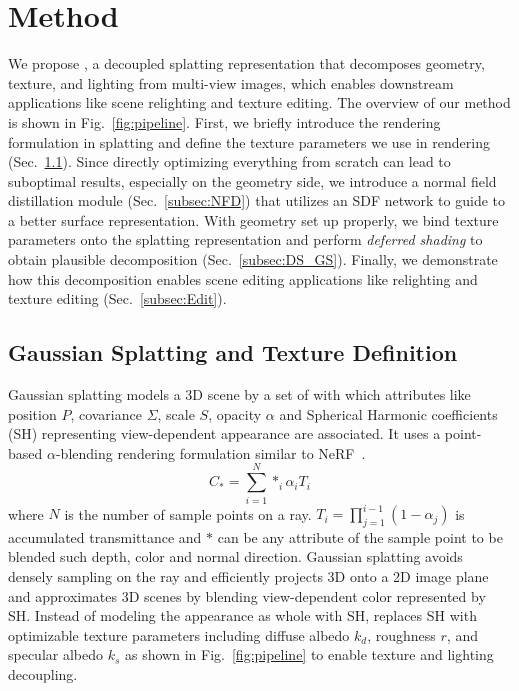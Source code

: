 \section{Method}
We propose \name, a decoupled  splatting representation that decomposes geometry, texture, and lighting from multi-view images, which enables downstream applications like scene relighting and texture editing. 
The overview of our method is shown in Fig.~\ref{fig:pipeline}. 
First, we briefly introduce the rendering formulation in  splatting and define the texture parameters we use in rendering (Sec.~\ref{subsec:GSR}).  
Since directly optimizing everything from scratch can lead to suboptimal results, especially on the geometry side, we introduce a normal field distillation module (Sec.~\ref{subsec:NFD}) that utilizes an SDF network to guide  to a better surface representation. 
With geometry set up properly, we bind texture parameters onto the  splatting representation and perform \textit{deferred shading} to obtain plausible decomposition (Sec.~\ref{subsec:DS_GS}). 
Finally, we demonstrate how this decomposition enables scene editing applications like relighting and texture editing (Sec.~\ref{subsec:Edit}). 



\subsection{Gaussian Splatting and Texture Definition}
\label{subsec:GSR}
Gaussian splatting models a 3D scene by a set of  with which attributes like position $P$, 
covariance $\Sigma$, 
scale $S$, opacity $\alpha$ and Spherical Harmonic coefficients (SH) representing view-dependent appearance are associated. 
It uses a point-based $\alpha$-blending rendering formulation similar to NeRF~\cite{NeRF}. 
\begin{equation}
\label{eqn:GSR}
C_* = \sum_{i=1}^N *_i \alpha_i T_i 
\end{equation}
where $N$ is the number of sample points on a ray. 
$T_i = \prod_{j=1}^{i-1} (1-\alpha_j)$ is accumulated transmittance and $*$ can be any attribute of the sample point to be blended such  depth, color and normal direction. 
Gaussian splatting avoids densely sampling on the ray and efficiently projects 3D  onto a 2D image plane and approximates 3D scenes by blending view-dependent color represented by SH. 
Instead of modeling the appearance as  whole with SH,  \name replaces SH with optimizable texture parameters including diffuse albedo $k_d$, roughness $r$, and specular albedo $k_s$ as shown in Fig.~\ref{fig:pipeline} to enable texture and lighting decoupling. 

